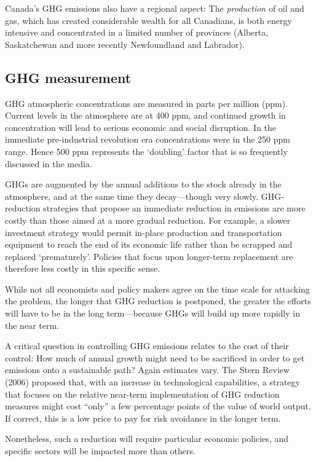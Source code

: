 Canada's GHG emissions also have a regional aspect: The \textit{production}
of oil and gas, which has created considerable wealth for all Canadians, is
both energy intensive and concentrated in a limited number of provinces
(Alberta, Saskatchewan and more recently Newfoundland and Labrador).

\newhtmlpage

\subsection*{GHG measurement}

GHG atmospheric concentrations are measured in parts per million (ppm).
Current levels in the atmosphere are at 400 ppm, and continued growth in
concentration will  lead to serious economic and social disruption. In the
immediate pre-industrial revolution era concentrations were in the 250 ppm
range. Hence 500 ppm represents the `doubling' factor that is so frequently
discussed in the media.

GHGs are augmented by the annual additions to the stock already in the
atmosphere, and at the same time they decay---though very slowly.
GHG-reduction strategies that propose an immediate reduction in emissions
are more costly than those aimed at a more gradual reduction. For example, a
slower investment strategy would permit in-place production and
transportation equipment to reach the end of its economic life rather than
be scrapped and replaced `prematurely'. Policies that focus upon longer-term
replacement are therefore less costly in this specific sense.

While not all economists and policy makers agree on the time scale for
attacking the problem, the longer that GHG reduction is postponed, the
greater the efforts will have to be in the long term---because GHGs will
build up more rapidly in the near term.

A critical question in controlling GHG emissions relates to the cost of
their control: How much of annual growth might need to be sacrificed in
order to get emissions onto a sustainable path? Again estimates vary. The
Stern Review (2006) proposed that, with an increase in technological
capabilities, a strategy that focuses on the relative near-term
implementation of GHG reduction measures might cost
``only'' a few percentage points of the value of world
output. If correct, this is a low price to pay for risk avoidance in the
longer term.

Nonetheless, such a reduction will require particular economic policies, and
specific sectors will be impacted more than others.

